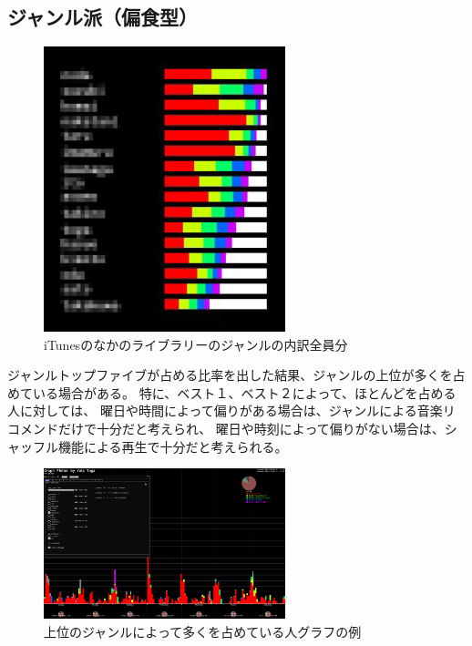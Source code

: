 \documentclass[11pt, twocolumn]{jsarticle}
\begin{document}
\subsection{ジャンル派（偏食型）}


\begin{figure}[h]
\begin{center}
\includegraphics[width=7cm]{sortedOther.jpg}
\caption{iTunesのなかのライブラリーのジャンルの内訳全員分}
\label{sortedOther}
\end{center}
\end{figure}


ジャンルトップファイブが占める比率を出した結果、ジャンルの上位が多くを占めている場合がある。
特に、ベスト１、ベスト２によって、ほとんどを占める人に対しては、
曜日や時間によって偏りがある場合は、ジャンルによる音楽リコメンドだけで十分だと考えられ、
曜日や時刻によって偏りがない場合は、シャッフル機能による再生で十分だと考えられる。
\begin{figure}[h]
\begin{center}
\includegraphics[width=7cm]{topFive_heavy.png}
\caption{上位のジャンルによって多くを占めている人グラフの例}
\label{topFive_heavy}
\end{center}
\end{figure}
\end{document}

